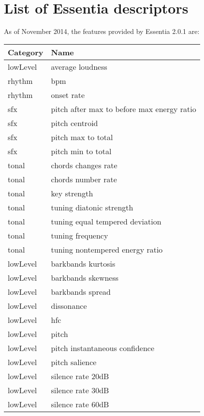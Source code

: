 \chapter{List of Essentia descriptors} 

\label{AppendixA}

As of November 2014, the features provided by Essentia 2.0.1 are:

\begin{center}
\begin{longtable}{| p{} | p{} |} 
\hline
\textbf{Category} & \textbf{Name} \\ \hline
lowLevel & average loudness \\ \hline
rhythm & bpm \\ \hline
rhythm & onset rate \\ \hline
sfx & pitch after max to before max energy ratio \\ \hline
sfx & pitch centroid \\ \hline
sfx & pitch max to total \\ \hline
sfx & pitch min to total \\ \hline
tonal & chords changes rate \\ \hline
tonal & chords number rate \\ \hline
tonal & key strength \\ \hline
tonal & tuning diatonic strength \\ \hline
tonal & tuning equal tempered deviation \\ \hline
tonal & tuning frequency \\ \hline
tonal & tuning nontempered energy ratio \\ \hline
lowLevel & barkbands kurtosis \\ \hline
lowLevel & barkbands skewness \\ \hline
lowLevel & barkbands spread \\ \hline
lowLevel & dissonance \\ \hline
lowLevel & hfc \\ \hline
lowLevel & pitch \\ \hline
lowLevel & pitch instantaneous confidence \\ \hline
lowLevel & pitch salience \\ \hline
lowLevel & silence rate 20dB \\ \hline
lowLevel & silence rate 30dB \\ \hline
lowLevel & silence rate 60dB \\ \hline

\end{longtable}
\end{center}

